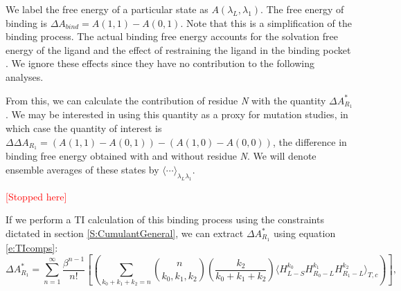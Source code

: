 \documentclass[%
 preprint,
 amsmath,amssymb,
 aps,
]{revtex4-1}
\newcommand{\warning}[1]{{\textsf{{\textcolor{red}{{[#1]}{}}}}}}
\renewcommand{\vec}[1]{{\mathbf{#1}}}
\begin{document}
We label the free energy of a particular state as $A(\lambda_L,\lambda_1)$.  The free energy of binding is 
$\Delta A_{bind} = A\left(1,1\right) - 
A\left(0,1 \right)$. 
Note that this is a simplification of the binding process.  The actual binding free energy accounts for the solvation free energy of the ligand and the effect of restraining the ligand in the binding pocket \cite{NULL}.  We ignore these effects
since they have no contribution to the following analyses. 


 From this, we can calculate the contribution of residue \emph{N} with the quantity $\Delta A^*_{R_1}$.  
 We may be interested in using this quantity as a proxy for mutation studies, in which case the quantity of interest is 
 $\Delta \Delta A_{R_1} = \left( A\left(1,1\right) - A\left(0,1\right) \right) -
 \left( A\left(1,0 \right)- A\left(0,0 \right)\right) $, 
 the difference in binding free energy obtained with and without residue \emph{N}.  
 We will denote ensemble averages of these states by $\langle \cdots \rangle_{\lambda_L \lambda_1}$.  
 
 \warning{Stopped here}
 
If we perform a TI calculation of this binding process using the constraints dictated in section \ref{S:CumulantGeneral}, we can extract $\Delta A^*_{R_1}$ using equation \ref{e:TIcomps}:
 \begin{equation}
\Delta A^*_ {R_1}=
\sum_{n=1}^{\infty}  \frac{\beta^{n-1}}{n!} 
\left[
\left(
 \sum_{k_0+k_1+k_2=n} 
{ n \choose k_0,k_1,k_2 } \left( \frac{k_2}{k_0+k_1+k_2} \right) \langle  H_{L-S}^{k_0} H_{R_0-L}^{k_1} H_{R_1-L}^{k_2} 
\rangle_{T,c}
\right)
\right],
\label{e:BradyDecomp:CBR}
\end{equation}
 
\end{document}
